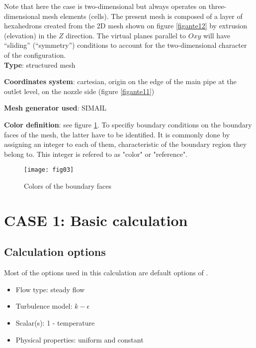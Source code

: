 Note that here the case is two-dimensional but \CS always operates on three-dimensional
mesh elements (cells). The present mesh is composed of a layer of hexahedrons
created from the 2D mesh shown on figure \ref{figante12} by
extrusion (elevation) in the $Z$ direction. The virtual planes
parallel to $Oxy$ will have ``sliding'' (``symmetry'') conditions to account for
the two-dimensional character of the configuration.\\

{\bfseries Type}: structured mesh

{\bfseries Coordinates system}: cartesian, origin on the edge of the main
pipe at the outlet level, on the nozzle side (figure \ref{figante11})

{\bfseries Mesh generator used}: SIMAIL

{\bfseries Color definition}: see figure \ref{figante13}. To specifiy boundary
conditions on the boundary faces of the mesh, the latter have to be
identified. It is commonly done by assigning an integer to each of them,
characteristic of the boundary region they belong to. This integer is refered to
as "color" or "reference".

\begin{figure}[ht]
\begin{center}
\texttt{[image: fig03]}
\caption{Colors of the boundary faces}
\label{figante13}
\end{center}
\end{figure}


\section{CASE 1: Basic calculation}

        \subsection{Calculation options}

Most of the options used in this calculation are default options of \CS.
\begin{itemize}
\renewcommand{\labelitemi}{$\rightarrow$}
        \item Flow type: steady flow
        \item Turbulence model: $k-\epsilon$
        \item Scalar(s): 1 - temperature
        \item Physical properties: uniform and constant
\end{itemize}


